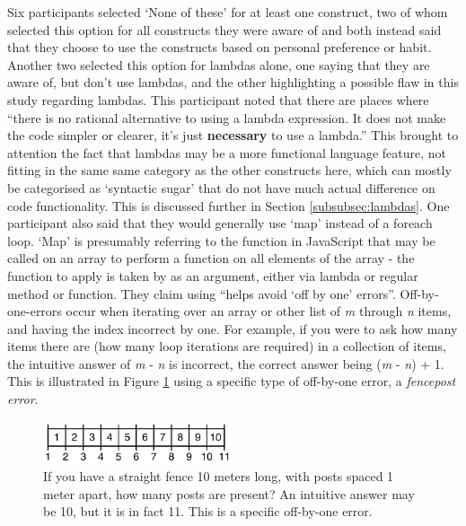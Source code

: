 \documentclass{article}
\begin{document}
            Six participants selected `None of these' for at least one construct, two of whom selected this option for all constructs they were aware of and both instead said that they choose to use the constructs based on personal preference or habit. Another two selected this option for lambdas alone, one saying that they are aware of, but don't use lambdas, and the other highlighting a possible flaw in this study regarding lambdas. This participant noted that there are places where ``there is no rational alternative to using a lambda expression. It does not make the code simpler or clearer, it's just \textbf{necessary} to use a lambda.'' This brought to attention the fact that lambdas may be a more functional language feature, not fitting in the same same category as the other constructs here, which can mostly be categorised as `syntactic sugar' that do not have much actual difference on code functionality. This is discussed further in Section \ref{subsubsec:lambdas}.
            One participant also said that they would generally use `map' instead of a foreach loop. `Map' is presumably referring to the  function in JavaScript that may be called on an array to perform a function on all elements of the array - the function to apply is taken by  as an argument, either via lambda or regular method or function. They claim using  ``helps avoid `off by one' errors''.  Off-by-one-errors occur when iterating over an array or other list of \textit{m} through \textit{n} items, and having the index incorrect by one. For example, if you were to ask how many items there are (how many loop iterations are required) in a collection of items, the intuitive answer of \textit{m} - \textit{n} is incorrect, the correct answer being (\textit{m} - \textit{n}) + 1. This is illustrated in Figure \ref{fig:fencepost} using a specific type of off-by-one error, a \textit{fencepost error}.

            \begin{figure}[htbp]
                \centering
                \includegraphics[width=0.5\textwidth]{fencepost}
                \caption{If you have a straight fence 10 meters long, with posts spaced 1 meter apart, how many posts are present? An intuitive answer may be 10, but it is in fact 11. This is a specific off-by-one error.}
                \label{fig:fencepost}
            \end{figure}
\end{document}
